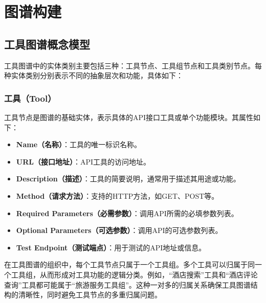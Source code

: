 \section{图谱构建}

\subsection{工具图谱概念模型}

工具图谱中的实体类别主要包括三种：工具节点、工具组节点和工具类别节点。每种实体类别分别表示不同的抽象层次和功能，具体如下：

\subsubsection{工具（Tool）}
工具节点是图谱的基础实体，表示具体的API接口工具或单个功能模块。其属性如下：
\begin{itemize}
    \item \textbf{Name（名称）}：工具的唯一标识名称。
    \item \textbf{URL（接口地址）}：API工具的访问地址。
    \item \textbf{Description（描述）}：工具的简要说明，通常用于描述其用途或功能。
    \item \textbf{Method（请求方法）}：支持的HTTP方法，如GET、POST等。
    \item \textbf{Required Parameters（必需参数）}：调用API所需的必填参数列表。
    \item \textbf{Optional Parameters（可选参数）}：调用API的可选参数列表。
    \item \textbf{Test Endpoint（测试端点）}：用于测试的API地址或信息。
\end{itemize}

在工具图谱的组织中，每个工具节点只属于一个工具组。多个工具可以归属于同一个工具组，从而形成对工具功能的逻辑分类。例如，“酒店搜索”工具和“酒店评论查询”工具都可能属于“旅游服务工具组”。这种一对多的归属关系确保工具图谱结构的清晰性，同时避免工具节点的多重归属问题。

